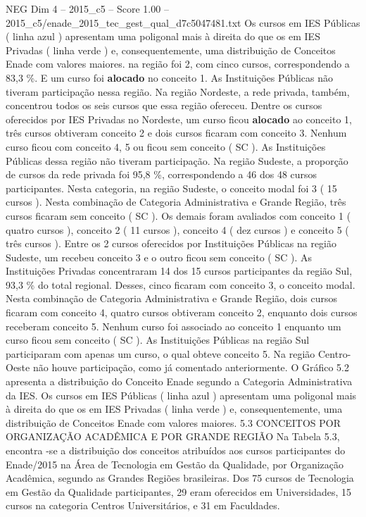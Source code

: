 \begin{textsample}{NEG Dim 4 – 2015\_c5 – Score 1.00 – 2015\_c5/enade\_2015\_tec\_gest\_qual\_d7c5047481.txt}
Os cursos em IES Públicas ( linha azul ) apresentam uma poligonal mais à direita do que os em IES Privadas ( linha verde ) e, consequentemente, uma distribuição de Conceitos Enade com valores maiores. na região foi 2, com cinco cursos, correspondendo a 83,3 \%.
E um curso foi \textbf{alocado} no conceito 1.
As Instituições Públicas não tiveram participação nessa região.
Na região Nordeste, a rede privada, também, concentrou todos os seis cursos que essa região ofereceu.
Dentre os cursos oferecidos por IES Privadas no Nordeste, um curso ficou \textbf{alocado} ao conceito 1, três cursos obtiveram conceito 2 e dois cursos ficaram com conceito 3.
Nenhum curso ficou com conceito 4, 5 ou ficou sem conceito ( SC ).
As Instituições Públicas dessa região não tiveram participação.
Na região Sudeste, a proporção de cursos da rede privada foi 95,8 \%, correspondendo a 46 dos 48 cursos participantes.
Nesta categoria, na região Sudeste, o conceito modal foi 3 ( 15 cursos ).
Nesta combinação de Categoria Administrativa e Grande Região, três cursos ficaram sem conceito ( SC ).
Os demais foram avaliados com conceito 1 ( quatro cursos ), conceito 2 ( 11 cursos ), conceito 4 ( dez cursos ) e conceito 5 ( três cursos ).
Entre os 2 cursos oferecidos por Instituições Públicas na região Sudeste, um recebeu conceito 3 e o outro ficou sem conceito ( SC ).
As Instituições Privadas concentraram 14 dos 15 cursos participantes da região Sul, 93,3 \% do total regional.
Desses, cinco ficaram com conceito 3, o conceito modal.
Nesta combinação de Categoria Administrativa e Grande Região, dois cursos ficaram com conceito 4, quatro cursos obtiveram conceito 2, enquanto dois cursos receberam conceito 5.
Nenhum curso foi associado ao conceito 1 enquanto um curso ficou sem conceito ( SC ).
As Instituições Públicas na região Sul participaram com apenas um curso, o qual obteve conceito 5.
Na região Centro-Oeste não houve participação, como já comentado anteriormente.
O Gráfico 5.2 apresenta a distribuição do Conceito Enade segundo a Categoria Administrativa da IES.
Os cursos em IES Públicas ( linha azul ) apresentam uma poligonal mais à direita do que os em IES Privadas ( linha verde ) e, consequentemente, uma distribuição de Conceitos Enade com valores maiores. 5.3 CONCEITOS POR ORGANIZAÇÃO ACADÊMICA E POR GRANDE REGIÃO Na Tabela 5.3, encontra -se a distribuição dos conceitos atribuídos aos cursos participantes do Enade/2015 na Área de Tecnologia em Gestão da Qualidade, por Organização Acadêmica, segundo as Grandes Regiões brasileiras.
Dos 75 cursos de Tecnologia em Gestão da Qualidade participantes, 29 eram oferecidos em Universidades, 15 cursos na categoria Centros Universitários, e 31 em Faculdades.

\end{textsample}
